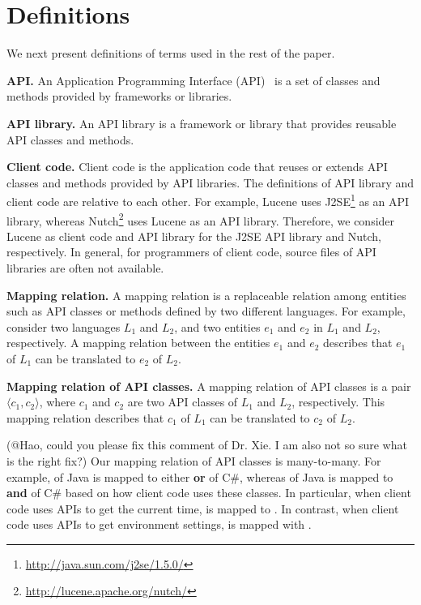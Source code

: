 \section{Definitions}
\label{sec:mapping}

We next present definitions of terms used in the rest of the paper.

\textbf{API.} An Application Programming Interface (API)~\cite{orenstein2000quickstudy}
is a set of classes and methods provided by frameworks or libraries.

\textbf{API library.} An API library is a framework
or library that provides reusable API classes and methods.

\textbf{Client code.} Client code is the application code
that reuses or extends API classes and methods provided by API
libraries. The definitions of API library and client code are
relative to each other. For example, Lucene uses
J2SE\footnote{\url{http://java.sun.com/j2se/1.5.0/}} as an API
library, whereas Nutch\footnote{\url{http://lucene.apache.org/nutch/}} uses Lucene as
an API library. Therefore, we consider Lucene as client code and API
library for the J2SE API library and Nutch, respectively. In
general, for programmers of client code, source files of API libraries are often
not available.

\textbf{Mapping relation.} A mapping relation is a
replaceable relation among entities such as API classes or methods
defined by two different languages. For example, consider two
languages $L_1$ and $L_2$, and two entities $e_1$ and $e_2$ in
$L_1$ and $L_2$, respectively. A mapping
relation between the entities $e_1$ and $e_2$ describes 
that $e_1$ of $L_1$ can be translated to $e_2$ of $L_2$.

\textbf{Mapping relation of API classes.} A mapping relation
of API classes is a pair $\langle c_1, c_2 \rangle$, where
$c_1$ and $c_2$ are two API classes of $L_1$ and $L_2$,
respectively. This mapping relation describes that 
$c_1$ of $L_1$ can be translated to $c_2$ of $L_2$.

(@Hao, could you please fix this comment of Dr. Xie.
I am also not so sure what is the right fix?)
Our mapping relation of API classes is many-to-many. For example,
 of Java is mapped to either
 \textbf{or}
 of C\#, whereas
 of Java is mapped to
 \textbf{and}  of
C\# based on how client code uses these classes. In particular, when
client code uses APIs to get the current time,
 is mapped to . In
contrast, when client code uses APIs to get environment settings,
 is mapped with
.

